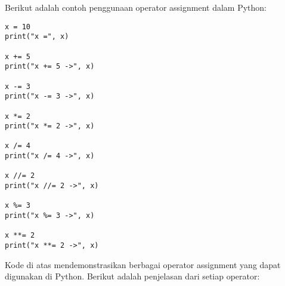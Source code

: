 Berikut adalah contoh penggunaan operator assignment dalam Python:
\begin{lstlisting}[style=PythonStyle, caption={Kode Python: assignment_operator.py}]
x = 10
print("x =", x)

x += 5
print("x += 5 ->", x)

x -= 3
print("x -= 3 ->", x)

x *= 2
print("x *= 2 ->", x)

x /= 4
print("x /= 4 ->", x)

x //= 2
print("x //= 2 ->", x)

x %= 3
print("x %= 3 ->", x)

x **= 2
print("x **= 2 ->", x)
\end{lstlisting}

Kode di atas mendemonstrasikan berbagai operator assignment yang dapat digunakan di Python. 
Berikut adalah penjelasan dari setiap operator:
